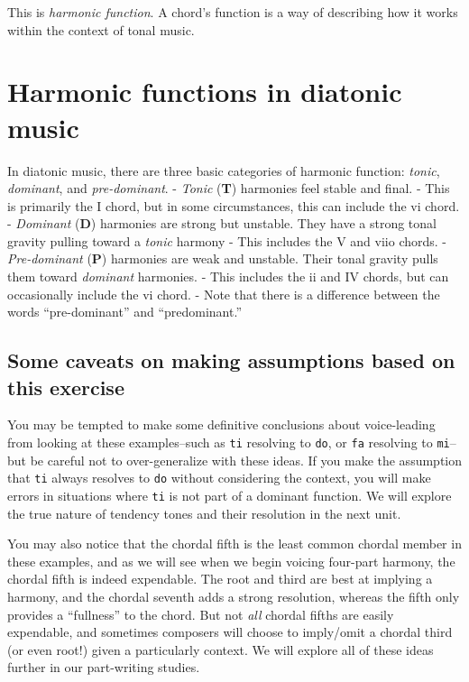 \documentclass{book}
\begin{document}
This is \emph{harmonic function}. A chord's function is a way of describing
how it works within the context of tonal music.

\hypertarget{harmonic-functions-in-diatonic-music}{%
\section{Harmonic functions in diatonic
music}\label{harmonic-functions-in-diatonic-music}}

In diatonic music, there are three basic categories of harmonic function:
\emph{tonic}, \emph{dominant}, and \emph{pre-dominant}. - \emph{Tonic}
(\textbf{T}) harmonies feel stable and final. - This is primarily the I chord,
but in some circumstances, this can include the vi chord. - \emph{Dominant}
(\textbf{D}) harmonies are strong but unstable. They have a strong tonal
gravity pulling toward a \emph{tonic} harmony - This includes the V and viio
chords. - \emph{Pre-dominant} (\textbf{P}) harmonies are weak and unstable.
Their tonal gravity pulls them toward \emph{dominant} harmonies. - This
includes the ii and IV chords, but can occasionally include the vi chord. -
Note that there is a difference between the words ``pre-dominant'' and
``predominant.''

\hypertarget{some-caveats-on-making-assumptions-based-on-this-exercise}{%
\subsection{Some caveats on making assumptions based on this
exercise}\label{some-caveats-on-making-assumptions-based-on-this-exercise}}

You may be tempted to make some definitive conclusions about voice-leading
from looking at these examples--such as \texttt{ti} resolving to \texttt{do},
or \texttt{fa} resolving to \texttt{mi}--but be careful not to over-generalize
with these ideas. If you make the assumption that \texttt{ti} always resolves
to \texttt{do} without considering the context, you will make errors in
situations where \texttt{ti} is not part of a dominant function. We will
explore the true nature of tendency tones and their resolution in the next
unit.

You may also notice that the chordal fifth is the least common chordal member
in these examples, and as we will see when we begin voicing four-part harmony,
the chordal fifth is indeed expendable. The root and third are best at
implying a harmony, and the chordal seventh adds a strong resolution, whereas
the fifth only provides a ``fullness'' to the chord. But not \emph{all}
chordal fifths are easily expendable, and sometimes composers will choose to
imply/omit a chordal third (or even root!) given a particularly context. We
will explore all of these ideas further in our part-writing studies.
\end{document}
